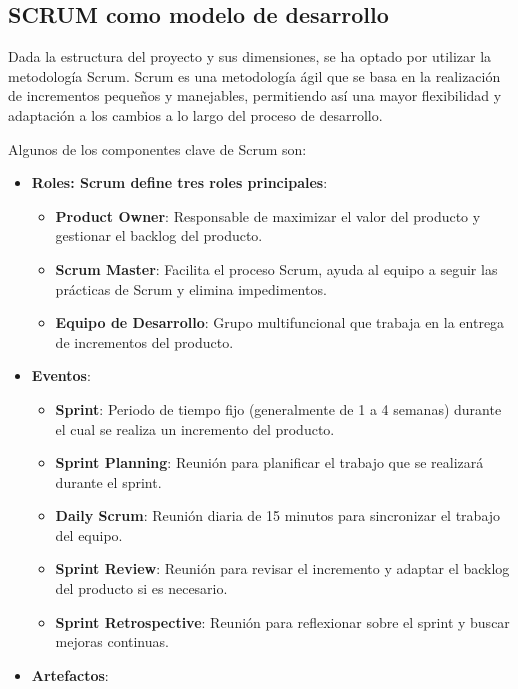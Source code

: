 \subsection{SCRUM como modelo de desarrollo}
Dada la estructura del proyecto y sus dimensiones, se ha optado por utilizar la metodología Scrum. Scrum es una metodología ágil que se basa en la realización de incrementos pequeños y manejables, permitiendo así una mayor flexibilidad y adaptación a los cambios a lo largo del proceso de desarrollo.

Algunos de los componentes clave de Scrum son:
\begin{itemize}

    \item\textbf{Roles: Scrum define tres roles principales}:
    \begin{itemize}
 
        \item\textbf{Product Owner}: Responsable de maximizar el valor del producto y gestionar el backlog del producto.
        \item\textbf{Scrum Master}: Facilita el proceso Scrum, ayuda al equipo a seguir las prácticas de Scrum y elimina impedimentos.
        \item\textbf{Equipo de Desarrollo}: Grupo multifuncional que trabaja en la entrega de incrementos del producto.
          
    \end{itemize}
    \item\textbf{Eventos}:
    \begin{itemize}

        \item\textbf{Sprint}: Periodo de tiempo fijo (generalmente de 1 a 4 semanas) durante el cual se realiza un incremento del producto.
        \item\textbf{Sprint Planning}: Reunión para planificar el trabajo que se realizará durante el sprint.
        \item\textbf{Daily Scrum}: Reunión diaria de 15 minutos para sincronizar el trabajo del equipo.
        \item\textbf{Sprint Review}: Reunión para revisar el incremento y adaptar el backlog del producto si es necesario.
        \item\textbf{Sprint Retrospective}: Reunión para reflexionar sobre el sprint y buscar mejoras continuas.
           
    \end{itemize}
    \item\textbf{Artefactos}:
    \begin{itemize}


\end{itemize}
\end{itemize}
